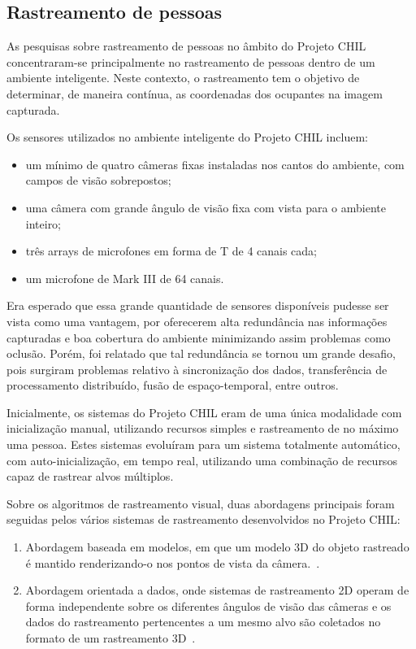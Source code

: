 \subsection{Rastreamento de pessoas}

As pesquisas sobre rastreamento de pessoas no âmbito do Projeto CHIL concentraram-se principalmente no rastreamento de pessoas dentro de um ambiente inteligente. Neste contexto, o rastreamento tem o objetivo de determinar,  de maneira contínua, as coordenadas dos ocupantes na imagem capturada.

Os sensores utilizados no ambiente inteligente do Projeto CHIL incluem:	
	\begin{itemize}
		\item um mínimo de quatro câmeras fixas instaladas nos cantos do ambiente, com campos de visão sobrepostos;
		\item uma câmera com grande ângulo de visão fixa com vista para o ambiente inteiro;
		\item três arrays de microfones em forma de T de 4 canais cada;
		\item um microfone de Mark III de 64 canais.
	\end{itemize}

Era esperado que essa grande quantidade de sensores disponíveis pudesse ser vista como uma vantagem, por oferecerem alta redundância nas informações capturadas e boa cobertura do ambiente minimizando assim problemas como oclusão. Porém, foi relatado que tal redundância se tornou um grande desafio, pois surgiram problemas relativo à sincronização dos dados, transferência de processamento distribuído, fusão de espaço-temporal, entre outros.

Inicialmente, os sistemas do Projeto CHIL eram de uma única modalidade com inicialização manual, utilizando recursos simples e rastreamento de no máximo uma pessoa. Estes sistemas evoluíram para um sistema totalmente automático, com auto-inicialização, em tempo real, utilizando uma combinação de recursos capaz de rastrear alvos múltiplos.

Sobre os algoritmos de rastreamento visual, duas abordagens principais foram seguidas pelos vários sistemas de rastreamento desenvolvidos no Projeto CHIL:

	\begin{enumerate}
		\item Abordagem baseada em modelos, em que um modelo 3D do objeto rastreado é mantido renderizando-o nos pontos de vista da câmera.~\cite{chilref1,chilref2,chilref3}.
		\item Abordagem orientada a dados, onde sistemas de rastreamento 2D operam de forma independente sobre os diferentes ângulos de visão das câmeras e os dados do rastreamento pertencentes a um mesmo alvo são coletados no formato de um rastreamento 3D~\cite{chilref4,chilref5}.
	\end{enumerate}	


